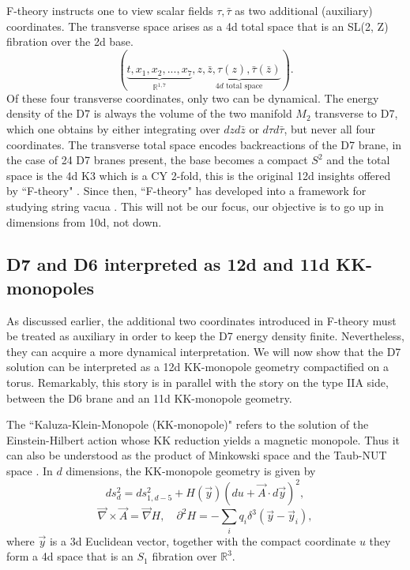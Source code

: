 F-theory \cite{Vafa:1996xn} instructs one to view scalar fields $\tau,\bar\tau$ as two additional (auxiliary) coordinates. 
The transverse space arises as a 4d total space that is an SL(2, Z) fibration over the 2d base. 
\begin{equation}
(\underbrace{t,x_1,x_2,...,x_7}_{\mathbb{R}^{1,7}},
\underbrace{z,\bar z,\tau(z),\bar\tau(\bar z)}_{4d \text{ total space}}).
\end{equation}
Of these four transverse coordinates, only two can be dynamical. 
The energy density of the D7 is always the volume of the two manifold $M_2$ transverse to D7, which one obtains by either integrating over $dzd\bar z$ or $d\tau d\bar \tau$, but never all four coordinates. The transverse total space encodes backreactions of the D7 brane, in the case of 24 D7 branes present, the base becomes a compact $S^2$ and the total space is the 4d K3 which is a CY 2-fold, this is the original 12d insights offered by ``F-theory" \cite{Vafa:1996xn}.
Since then, ``F-theory" has developed into a framework for studying string vacua \cite{Weigand:2018rez,Heckman:2010bq,Knapp:2011ip, Maharana:2012tu}.
This will not be our focus, our objective is to go up in dimensions from 10d, not down.

\subsection{D7 and D6 interpreted as 12d and 11d KK-monopoles}
As discussed earlier, the additional two coordinates introduced in F-theory \cite{Vafa:1996xn} must be treated as auxiliary in order to keep the D7 energy density finite.
Nevertheless, they can acquire a more dynamical interpretation.
We will now show that the D7 solution can be interpreted as a 12d KK-monopole geometry compactified on a torus.
Remarkably, this story is in parallel with the story on the type IIA side, between the D6 brane and an 11d KK-monopole geometry.

The ``Kaluza-Klein-Monopole (KK-monopole)" \cite{Gross:1983hb,Sorkin:1983ns} refers to the solution of the Einstein-Hilbert action whose KK reduction yields a magnetic monopole.
Thus it can also be understood as the product of Minkowski space and the Taub-NUT space \cite{Ortin:2015hya}.
In $d$ dimensions, the KK-monopole geometry is given by
\cite{Eguchi:1980jx}
\begin{equation}
ds_d^2 = ds_{1,d-5}^2 + H(\vec{y})(du + \vec{A}\cdot d\vec{y})^2,
\label{d-dim KK-monopole}
\end{equation}
\begin{equation}
\vec{\nabla} \times \vec A = \vec\nabla H,\quad
\partial^2 H=-\sum_i q_i \delta^3(\vec{y}-\vec{y}_i),
\label{kk monopole einstein eqs}
\end{equation}
where $\vec{y}$ is a 3d Euclidean vector, together with the compact coordinate $u$ they form a 4d space that is an $S_1$ fibration over $\mathbb{R}^3$.

